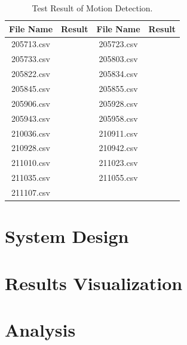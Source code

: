 \begin{table}[!h]
\centering
\caption{Test Result of Motion Detection.}
\label{test motion}
    \begin{tabular}{cc|cc}
    \toprule
    \textbf{File Name} & \textbf{Result} & \textbf{File Name} & \textbf{Result} \\
    \midrule
    205713.csv &  & 205723.csv & \\
    205733.csv &  & 205803.csv & \\
    205822.csv &  & 205834.csv & \\
    205845.csv &  & 205855.csv & \\
    205906.csv &  & 205928.csv & \\
    205943.csv &  & 205958.csv & \\
    210036.csv &  & 210911.csv & \\
    210928.csv &  & 210942.csv & \\
    211010.csv &  & 211023.csv & \\
    211035.csv &  & 211055.csv & \\
    211107.csv & \\
    \bottomrule
    \end{tabular}
\end{table}


\clearpage
\newpage
\section{System Design}
\section{Results Visualization}
\section{Analysis}

